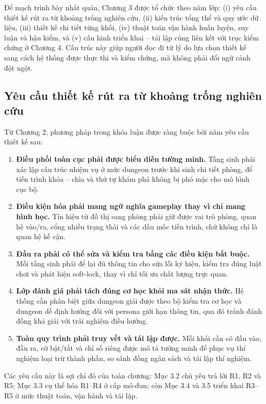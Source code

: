 \documentclass[oneside,a4paper,12pt]{extreport}
\begin{document}
Để mạch trình bày nhất quán, Chương 3 được tổ chức theo năm lớp: (i) yêu cầu thiết kế rút ra từ khoảng trống nghiên cứu, (ii) kiến trúc tổng thể và quy ước dữ liệu, (iii) thiết kế chi tiết từng khối, (iv) thuật toán vận hành huấn luyện, suy luận và hậu kiểm, và (v) cấu hình triển khai -- tái lập cùng liên kết với trục kiểm chứng ở Chương 4. Cấu trúc này giúp người đọc đi từ lý do lựa chọn thiết kế sang cách hệ thống được thực thi và kiểm chứng, mà không phải đổi ngữ cảnh đột ngột.

\subsection{Yêu cầu thiết kế rút ra từ khoảng trống nghiên cứu}
Từ Chương 2, phương pháp trong khóa luận được ràng buộc bởi năm yêu cầu thiết kế sau:
\begin{enumerate}[label=(R\arabic*)]
  \item \textbf{Điều phối toàn cục phải được biểu diễn tường minh.} Tầng sinh phải xác lập cấu trúc nhiệm vụ ở mức dungeon trước khi sinh chi tiết phòng, để tiến trình khóa -- chìa và thứ tự khám phá không bị phó mặc cho mô hình cục bộ.
  \item \textbf{Điều kiện hóa phải mang ngữ nghĩa gameplay thay vì chỉ mang hình học.} Tín hiệu từ đồ thị sang phòng phải giữ được vai trò phòng, quan hệ vào/ra, cổng nhiều trạng thái và các dấu mốc tiến trình, chứ không chỉ là quan hệ kề cận.
  \item \textbf{Đầu ra phải có thể sửa và kiểm tra bằng các điều kiện bắt buộc.} Mỗi tầng sinh phải để lại đủ thông tin cho sửa lỗi ký hiệu, kiểm tra đúng luật chơi và phát hiện soft-lock, thay vì chỉ tối ưu chất lượng trực quan.
  \item \textbf{Lớp đánh giá phải tách đúng cơ học khỏi ma sát nhận thức.} Hệ thống cần phân biệt giữa dungeon giải được theo bộ kiểm tra cơ học và dungeon dễ định hướng đối với persona giới hạn thông tin, qua đó tránh đánh đồng khả giải với trải nghiệm điều hướng.
  \item \textbf{Toàn quy trình phải truy vết và tái lập được.} Mỗi khối cần có đầu vào, đầu ra, cờ bật/tắt và chỉ số riêng được mô tả tường minh để phục vụ thí nghiệm loại trừ thành phần, so sánh đồng ngân sách và tái lập thí nghiệm.
\end{enumerate}

Các yêu cầu này là sợi chỉ đỏ của toàn chương: Mục 3.2 chủ yếu trả lời R1, R2 và R5; Mục 3.3 cụ thể hóa R1--R4 ở cấp mô-đun; còn Mục 3.4 và 3.5 triển khai R3--R5 ở mức thuật toán, vận hành và tái lập.
\end{document}
